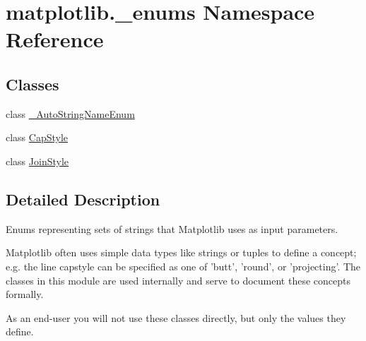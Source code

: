 \hypertarget{namespacematplotlib_1_1__enums}{}\section{matplotlib.\+\_\+enums Namespace Reference}
\label{namespacematplotlib_1_1__enums}
\subsection*{Classes}
\begin{DoxyCompactItemize}
\item 
class \hyperlink{classmatplotlib_1_1__enums_1_1__AutoStringNameEnum}{\+\_\+\+Auto\+String\+Name\+Enum}
\item 
class \hyperlink{classmatplotlib_1_1__enums_1_1CapStyle}{Cap\+Style}
\item 
class \hyperlink{classmatplotlib_1_1__enums_1_1JoinStyle}{Join\+Style}
\end{DoxyCompactItemize}


\subsection{Detailed Description}
\begin{DoxyVerb}Enums representing sets of strings that Matplotlib uses as input parameters.

Matplotlib often uses simple data types like strings or tuples to define a
concept; e.g. the line capstyle can be specified as one of 'butt', 'round',
or 'projecting'. The classes in this module are used internally and serve to
document these concepts formally.

As an end-user you will not use these classes directly, but only the values
they define.
\end{DoxyVerb}
 